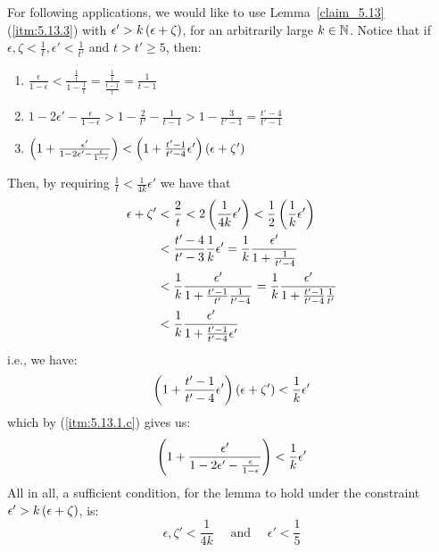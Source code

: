    \remark[Remark 5.13.1]\label{remark_5.13.1}
        For following applications, we would like to use Lemma~\ref{claim_5.13} (\ref{itm:5.13.3}) with
        $\epsilon' > k \left( \epsilon + \zeta \right)$, for an arbitrarily large $k \in \mathbb{N}$.
        Notice that if $\epsilon, \zeta < \frac{1}{t}, \epsilon' < \frac{1}{t'}$ and $t > t' \geq 5$, then:
        \begin{enumerate}[label=(\alph*), ref=\alph*]
            \item $\frac{\epsilon}{1-\epsilon} < \frac{\frac{1}{t}}{1-\frac{1}{t}} = \frac{\frac{1}{t}}{\frac{t-1}{t}}
                = \frac{1}{t-1}$
            \item $1 - 2 \epsilon' - \frac{\epsilon}{1-\epsilon} > 1 - \frac{2}{t'} - \frac{1}{t-1} > 1 - \frac{3}{t'-1}
                = \frac{t'-4}{t'-1}$
            \item\label{itm:5.13.1.c} $\left( 1 + \frac{\epsilon'}{1 - 2 \epsilon' - \frac{\epsilon}{1-\epsilon}} \right) <
                \left( 1 + \frac{t'-1}{t'-4} \epsilon' \right) \left( \epsilon + \zeta' \right)$
        \end{enumerate}
        Then, by requiring $\frac{1}{t} < \frac{1}{4k}\epsilon'$ we have that
        \begin{align*}
            \epsilon + \zeta'
                & < \frac{2}{t} < 2 \left( \frac{1}{4k}\epsilon' \right) < \frac{1}{2} \left( \frac{1}{k}\epsilon' \right) \\
                & < \frac{t'-4}{t'- 3} \frac{1}{k} \epsilon' = \frac{1}{k} \frac{\epsilon'}{1 + \frac{1}{t'-4}} \\
                & < \frac{1}{k} \frac{\epsilon'}{1 + \frac{t'-1}{t'}\frac{1}{t'-4}} = \frac{1}{k} \frac{\epsilon'}{1 + \frac{t'-1}{t'-4}\frac{1}{t'}} \\
                & < \frac{1}{k} \frac{\epsilon'}{1 + \frac{t'-1}{t'-4}\epsilon'}
        \end{align*}
        i.e., we have:
        $$
            \left( 1 + \frac{t'-1}{t'-4} \epsilon' \right) \left( \epsilon + \zeta' \right) < \frac{1}{k} \epsilon'
        $$
        which by (\ref{itm:5.13.1.c}) gives us:
        $$
            \left( 1 + \frac{\epsilon'}{1 - 2 \epsilon' - \frac{\epsilon}{1-\epsilon}} \right) < \frac{1}{k} \epsilon'
        $$
        All in all, a sufficient condition, for the lemma to hold under the constraint $\epsilon' > k \left( \epsilon + \zeta \right)$, is:
        $$
            \epsilon, \zeta' < \frac{1}{4k} \quad \text{ and } \quad \epsilon' < \frac{1}{5}
        $$

